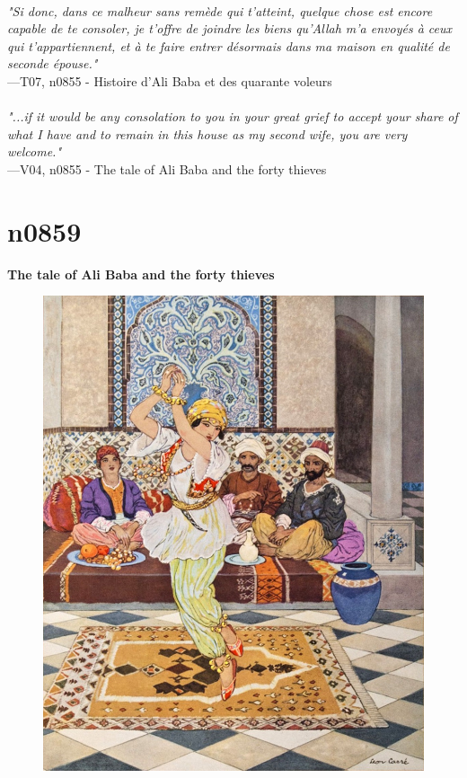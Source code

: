 \documentclass[../Carre_nights.tex]{subfiles}
\begin{document}
\textit{\\
"Si donc, dans ce malheur sans remède qui t’atteint, quelque chose est encore capable de te consoler, je t’offre de joindre les biens qu’Allah m’a envoyés à ceux qui t’appartiennent, et à te faire entrer désormais dans ma maison en qualité de seconde épouse."} \\
—T07, n0855 - Histoire d'Ali Baba et des quarante voleurs \\~\\
\textit{"...if it would be any consolation to you in your great grief to accept your share of what I have and to remain in this house as my second wife, you are very welcome."} \\
—V04, n0855 - The tale of Ali Baba and the forty thieves

\newpage

\section{n0859}
\textbf{\Large{The tale of Ali Baba and the forty thieves}} \\

\begin{figure}[ht]
\centering
\includegraphics[height=\figsize]{illustrations/volume_7/T07, n0859 - Histoire d'Ali Baba et des quarante voleurs.jpg}
\end{figure}
\end{document}
